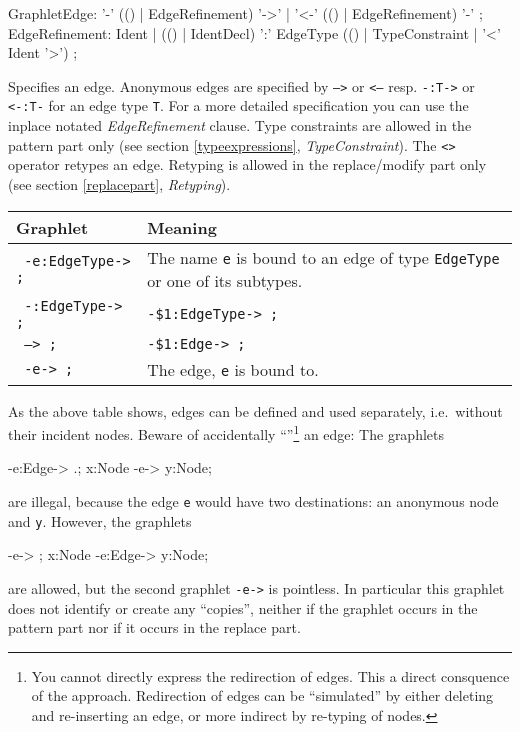 \begin{rail}
  GraphletEdge: '-' (() | EdgeRefinement) '->'  | '<-' (() | EdgeRefinement) '-' ;
  EdgeRefinement: Ident | (() | IdentDecl) ':' EdgeType (() | TypeConstraint | '<' Ident '>') ;
\end{rail}
Specifies an edge. Anonymous edges are specified by \texttt{-->} or \texttt{<--} resp. \texttt{-:T->} or \texttt{<-:T-} for an edge type \texttt{T}. For a more detailed specification you can use the inplace notated \emph{EdgeRefinement} clause. Type constraints are allowed in the pattern part only (see section \ref{typeexpressions}, \emph{TypeConstraint}). The \texttt{<>} operator retypes an edge. Retyping is allowed in the replace/modify part only (see section \ref{replacepart}, \emph{Retyping}).\\
\begin{center}
  \begin{tabularx}{\linewidth}{lX}
    \textbf{Graphlet} & \textbf{Meaning}\\ \hline
    \texttt{ -e:EdgeType-> ;} & The name \texttt{e} is bound to an edge of type \texttt{EdgeType} or one of its subtypes. \\
    \texttt{ -:EdgeType-> ;} & \texttt{-\$1:EdgeType-> ;} \\
    \texttt{ --> ;} & \texttt{-\$1:Edge-> ;} \\
    \texttt{ -e-> ;} & The edge, \texttt{e} is bound to.
  \end{tabularx}
\end{center} 
As the above table shows, edges can be defined and used separately, i.e.\ without their incident nodes. Beware of accidentally ``''\footnote{You cannot directly express the redirection of edges. This a direct consquence of the  approach. Redirection of edges can be ``simulated'' by either deleting and re-inserting an edge, or more indirect by re-typing of nodes.} an edge: 
The graphlets
\begin{grgenlet}
-e:Edge-> .;
x:Node -e-> y:Node;
\end{grgenlet}
are illegal, because the edge \texttt{e} would have two destinations: an anonymous node and \texttt{y}.
However, the graphlets
\begin{grgenlet}
-e-> ;
x:Node -e:Edge-> y:Node;
\end{grgenlet}
are allowed, but the second graphlet \texttt{-e->} is pointless. In particular this graphlet does not identify or create any ``copies'', neither if the graphlet occurs in the pattern part nor if it occurs in the replace part.
